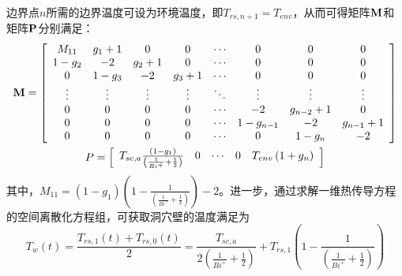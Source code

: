 边界点$n$所需的边界温度可设为环境温度，即${T_{rs,n + 1}} = {T_{env}}$，从而可得矩阵${\bf{M}}$和矩阵${\bf{P}}$分别满足\cite{Cavern-wall-09,Model-AA-CAES-10}：
\begin{subequations}
\begin{gather}
{\bf{M}} = \left[ {\begin{array}{*{20}{c}}
{{M_{11}}}&{{g_1} + 1}&0&0& \cdots &0&0&0\\
{1 - {g_2}}&{ - 2}&{{g_2} + 1}&0& \cdots &0&0&0\\
0&{1 - {g_3}}&{ - 2}&{{g_3} + 1}& \cdots &0&0&0\\
 \vdots & \vdots & \vdots & \vdots & \ddots & \vdots & \vdots & \vdots \\
0&0&0&0& \cdots &{ - 2}&{{g_{n - 2}} + 1}&0\\
0&0&0&0& \cdots &{1 - {g_{n - 1}}}&{ - 2}&{{g_{n - 1}} + 1}\\
0&0&0&0& \cdots &0&{1 - {g_n}}&{ - 2}
\end{array}} \right]\\
P = \left[ {\begin{array}{*{20}{c}}
{{T_{sc,a}}\frac{{\left( {1 - {g_1}} \right)}}{{\left( {\frac{1}{{B{i^ + }}} + \frac{1}{2}} \right)}}}&0& \cdots &0&{{T_{env}}\left( {1 + {g_n}} \right)}
\end{array}} \right]
\end{gather}
\end{subequations}
其中，${M_{11}} = \left( {1 - {g_1}} \right)\left( {1 - \frac{1}{{\left( {\frac{1}{{B{i^ + }}} + \frac{1}{2}} \right)}}} \right) - 2$。进一步，通过求解一维热传导方程的空间离散化方程组，可获取洞穴壁的温度满足为
\begin{equation}
{T_w}\left( t \right) = \frac{{{T_{rs,1}}\left( t \right) + {T_{rs,0}}\left( t \right)}}{2} = \frac{{{T_{sc,a}}}}{{2\left( {\frac{1}{{B{i^ + }}} + \frac{1}{2}} \right)}} + {T_{rs,1}}({1 - \frac{1}{{({\frac{1}{{B{i^ + }}} + \frac{1}{2}})}}})
\end{equation}
